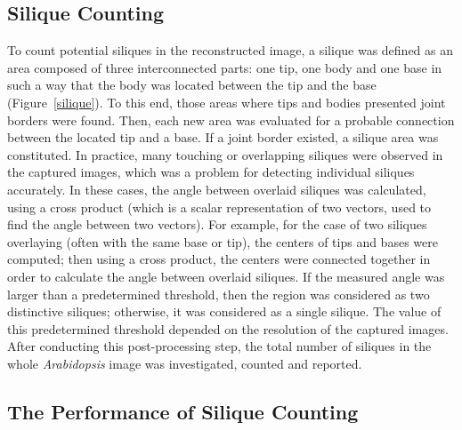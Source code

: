 \documentclass[a4paper,num-refs]{oup-contemporary}
\begin{document}
\subsection{Silique Counting}
To count  potential siliques in the reconstructed image, a silique was defined as an area composed of three interconnected parts: one tip, one body and one base in such a way that the body was located between the tip and the base (Figure~\ref{silique}). To this end, those areas where tips and bodies presented joint borders were found. Then, each new area was evaluated for a probable connection between the located tip and a base. If a joint border existed, a silique area was constituted.
In practice, many touching or overlapping siliques were observed in the captured images, which was a problem for detecting individual siliques accurately. In these cases, the angle between overlaid siliques was calculated, using a cross product (which is a scalar representation of two vectors, used to find the angle between two vectors). For example, for the case of two siliques overlaying (often with the same base or tip), the centers of tips and bases were computed; then using a cross product, the centers were connected together in order to calculate the angle between overlaid siliques. If the measured angle was larger than a predetermined threshold, then the region was considered as two distinctive siliques; otherwise, it was considered as a single silique. The value of this predetermined threshold depended on the resolution of the captured images.
After conducting this post-processing step, the total number of siliques in the whole \textit{Arabidopsis} image was investigated, counted and reported.
\subsection{The Performance of Silique Counting}
\end{document}
